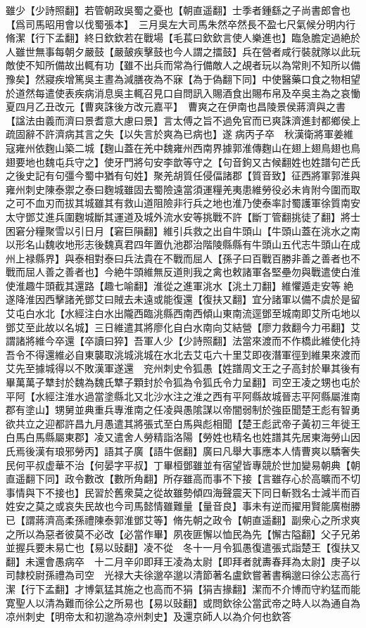 雖少【少詩照翻】若管朝政吳蜀之憂也【朝直遥翻】士季者鍾繇之子尚書郎會也【爲司馬昭用會以伐蜀張本】　三月吳左大司馬朱然卒然長不盈七尺氣候分明内行脩潔【行下孟翻】終日欽欽若在戰場【毛萇曰欽欽言使人樂進也】臨急膽定過絶於人雖世無事每朝夕嚴鼓【嚴皷疾擊鼓也今人謂之擂鼓】兵在營者咸行裝就隊以此玩敵使不知所備故出輒有功【雖不出兵而常為行備敵人之覘者玩以為常則不知所以備豫矣】然寢疾增篤吳主晝為減膳夜為不寐【為于偽翻下同】中使醫藥口食之物相望於道然每遣使表疾病消息吳主輒召見口自問訊入賜酒食出賜布帛及卒吳主為之哀慟　夏四月乙丑改元【曹爽誅後方改元嘉平】　曹爽之在伊南也昌陵景侯蔣濟與之書【諡法由義而濟曰景耆意大慮曰景】言太傅之旨不過免官而已爽誅濟進封都鄉侯上疏固辭不許濟病其言之失【以失言於爽為已病也】遂病丙子卒　秋漢衛將軍姜維寇雍州依麴山築二城【麴山蓋在羌中魏雍州西南界據郭淮傳麴山在翅上翅鳥翅也鳥翅要地也魏屯兵守之】使牙門將句安李歆等守之【句音鉤又古候翻姓也姓譜句芒氏之後史記有句彊今蜀中猶有句姓】聚羌胡質任侵偪諸郡【質音致】征西將軍郭淮與雍州刺史陳泰禦之泰曰麴城雖固去蜀險遠當須運糧羌夷患維勞役必未肯附今圍而取之可不血刃而拔其城雖其有救山道阻險非行兵之地也淮乃使泰率討蜀護軍徐質南安太守鄧艾進兵圍麴城斷其運道及城外流水安等挑戰不許【斷丁管翻挑徒了翻】將士困窘分糧聚雪以引日月【窘巨隕翻】維引兵救之出自牛頭山【牛頭山蓋在洮水之南以形名山魏收地形志後魏真君四年置仇池郡治階陵縣縣有牛頭山五代志牛頭山在成州上禄縣界】與泰相對泰曰兵法貴在不戰而屈人【孫子曰百戰百勝非善之善者也不戰而屈人善之善者也】今絶牛頭維無反道則我之禽也敕諸軍各堅壘勿與戰遣使白淮使淮趣牛頭截其還路【趣七喻翻】淮從之進軍洮水【洮土刀翻】維懼遁走安等絶遂降淮因西擊諸羌鄧艾曰賊去未遠或能復還【復扶又翻】宜分諸軍以備不虞於是留艾屯白水北【水經注白水出隴西臨洮縣西南西傾山東南流逕鄧至城南即艾所屯地以鄧艾至此故以名城】三日維遣其將廖化自白水南向艾結營【廖力救翻今力弔翻】艾謂諸將維今卒還【卒讀曰猝】吾軍人少【少詩照翻】法當來渡而不作橋此維使化持吾令不得還維必自東襲取洮城洮城在水北去艾屯六十里艾即夜潛軍徑到維果來渡而艾先至據城得以不敗漢軍遂還　兖州刺史令狐愚【姓譜周文王之子高封於畢其後有畢萬萬子犨封於魏為魏氏犨子顆封於令狐為令狐氏令力呈翻】司空王凌之甥也屯於平阿【水經注淮水過當塗縣北又北沙水注之淮之西有平阿縣故城晉志平阿縣屬淮南郡有塗山】甥舅並典重兵專淮南之任凌與愚隂謀以帝闇弱制於強臣聞楚王彪有智勇欲共立之迎都許昌九月愚遣其將張式至白馬與彪相聞【楚王彪武帝子黃初三年徙王白馬白馬縣屬東郡】凌又遣舍人勞精詣洛陽【勞姓也精名也姓譜其先居東海勞山因氏焉後漢有琅邪勞丙】語其子廣【語牛倨翻】廣曰凡舉大事應本人情曹爽以驕奢失民何平叔虚華不治【何晏字平叔】丁畢桓鄧雖並有宿望皆專競於世加變易朝典【朝直遥翻下同】政令數改【數所角翻】所存雖高而事不下接【言雖存心於高曠而不切事情與下不接也】民習於舊衆莫之從故雖勢傾四海聲震天下同日斬戮名士減半而百姓安之莫之或哀失民故也今司馬懿情雖難量【量音良】事未有逆而擢用賢能廣樹勝已【謂蔣濟高柔孫禮陳泰郭淮鄧艾等】脩先朝之政令【朝直遥翻】副衆心之所求爽之所以為惡者彼莫不必改【必當作畢】夙夜匪懈以恤民為先【懈古隘翻】父子兄弟並握兵要未易亡也【易以䜴翻】凌不從　冬十一月令狐愚復遣張式詣楚王【復扶又翻】未還會愚病卒　十二月辛卯即拜王凌為太尉【即拜者就夀春拜為太尉】庚子以司隸校尉孫禮為司空　光禄大夫徐邈卒邈以清節著名盧欽嘗著書稱邈曰徐公志高行潔【行下孟翻】才博氣猛其施之也高而不狷【狷吉掾翻】潔而不介博而守約猛而能寛聖人以清為難而徐公之所易也【易以䜴翻】或問欽徐公當武帝之時人以為通自為凉州刺史【明帝太和初邈為凉州刺史】及還京師人以為介何也欽答